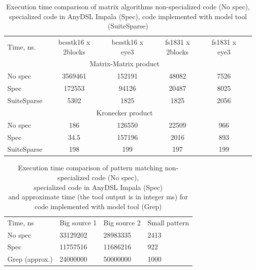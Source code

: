 \documentclass[conference]{IEEEtran}
\begin{document}
\begin{table}[!h]
\begin{tabular}{lccccc}

		Time, ns.   & bcsstk16 x 2blocks & bcsstk16 x eye3 & fs1831 x 2blocks & fs1831 x eye3 \\
		\multicolumn{5}{c}{Matrix-Matrix product}                                             \\
		No spec     & 3569461            & 152191          & 48082            & 7526          \\
		Spec        & 172553             & 94126           & 20487            & 8025          \\
		SuiteSparse & 5302               & 1825            & 1825             & 2056          \\
		\multicolumn{5}{c}{Kronecker product}                                                 \\
		No spec     & 186                & 126550          & 22509            & 966           \\
		Spec        & 34.5               & 157196          & 2016             & 893           \\
		SuiteSparse & 198                & 199             & 197              & 199          
\end{tabular}
\centering
\caption{Execution time comparison of matrix algorithms non-specialized code (No spec),\\ specialized code in AnyDSL Impala (Spec), code implemented with model tool (SuiteSparse)}
\label{table_graph}
\end{table}



\begin{table}[]
	\begin{tabular}{llll}
		Time, ns       & Big source 1 & Big source 2 & Small pattern \\
		No spec        & 33129202     & 28983335     & 2413          \\
		Spec           & 11757516     & 11686216     & 922           \\
		Grep (approx.) & 24000000     & 50000000     & 1000                   
	\end{tabular}
	\centering
	\caption{Execution time comparison of pattern matching non-specialized code (No spec),\\ specialized code in AnyDSL Impala (Spec) \\ and approximate time (the tool output is in integer ms) for code implemented with model tool (Grep)}
	\label{table_string}
\end{table}
\end{document}
